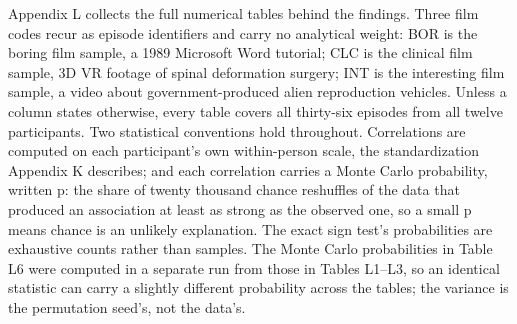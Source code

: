 %

Appendix L collects the full numerical tables behind the findings. Three film codes recur as
episode identifiers and carry no analytical weight: BOR is the boring film sample, a 1989
Microsoft Word tutorial; CLC is the clinical film sample, 3D VR footage of spinal deformation
surgery; INT is the interesting film sample, a video about government-produced alien
reproduction vehicles. Unless a column states otherwise, every table covers all thirty-six
episodes from all twelve participants. Two statistical conventions hold throughout.
Correlations are computed on each participant's own within-person scale, the standardization
Appendix K describes; and each correlation carries a Monte Carlo probability, written p: the
share of twenty thousand chance reshuffles of the data that produced an association at least
as strong as the observed one, so a small p means chance is an unlikely explanation. The
exact sign test's probabilities are exhaustive counts rather than samples. The Monte Carlo probabilities in Table L6 were computed in a separate run from those in Tables L1--L3, so an identical statistic can carry a slightly different probability across the tables; the variance is the permutation seed's, not the data's.

